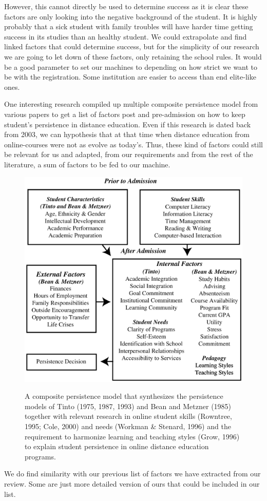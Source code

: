 \documentclass[../../main.tex]{subfiles}
\begin{document}
However, this cannot directly be used to determine success as it is clear these factors are only looking into the negative background of the student. It is highly probably that a sick student with family troubles will have harder time getting success in its studies than an healthy student. We could extrapolate and find linked factors that could determine success, but for the simplicity of our research we are going to let down of these factors, only retaining the school rules. It would be a good parameter to set our machines to depending on how strict we want to be with the registration. Some institution are easier to access than end elite-like ones.

One interesting research compiled up multiple composite persistence model from various papers to get a list of factors post and pre-admission on how to keep student's persistence in distance education\cite{rovai_search_2003}. Even if this research is dated back from 2003, we can hypothesis that at that time when distance education from online-courses were not as evolve as today's. Thus, these kind of factors could still be relevant for us and adapted, from our requirements and from the rest of the literature, a sum of factors to be fed to our machine.

\begin{figure}[H]
    \centering
    \includegraphics[width=1\linewidth]{res//diagram/composite-persistence-mdl.png}
    \caption{A composite persistence model that synthesizes the persistence models of Tinto (1975, 1987, 1993) and Bean and Metzner (1985) together with relevant research in online student skills (Rowntree, 1995; Cole, 2000) and needs (Workman \& Stenard, 1996) and the requirement to harmonize learning and teaching styles (Grow, 1996) to explain student persistence in online distance education programs. \cite{rovai_search_2003}}\cite{tinto_dropout_1975,bean_conceptual_1985,rowntree_teaching_1995}
    \label{fig:persistence-mdl}
\end{figure}

We do find similarity with our previous list of factors we have extracted from our review. Some are just more detailed version of ours that could be included in our list.
\end{document}
